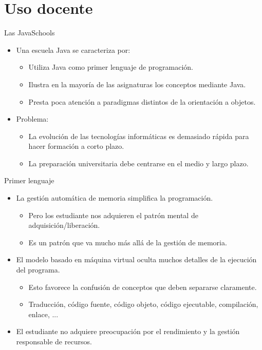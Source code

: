 \section{Uso docente}

\begin{frame}[t]{Las JavaSchools}
  \begin{itemize}
    \item Una escuela Java se caracteriza por:
      \begin{itemize}
        \item Utiliza Java como primer lenguaje de programación.
        \item Ilustra en la mayoría de las asignaturas los conceptos mediante Java.
        \item Presta poca atención a paradigmas distintos de la orientación a objetos.
      \end{itemize}
    \item Problema:
      \begin{itemize}
        \item La evolución de las tecnologías informáticas es demasiado rápida para hacer formación a corto plazo.
        \item La preparación universitaria debe centrarse en el medio y largo plazo.
      \end{itemize}
  \end{itemize}
\end{frame}

\begin{frame}[t]{Primer lenguaje}
  \begin{itemize}
    \item La gestión automática de memoria simplifica la programación.
      \begin{itemize}
        \item Pero los estudiante nos adquieren el patrón mental de adquisición/liberación.
        \item Es un patrón que va mucho más allá de la gestión de memoria.
      \end{itemize}
    \item El modelo basado en máquina virtual oculta muchos detalles de la ejecución del programa.
      \begin{itemize}
        \item Esto favorece la confusión de conceptos que deben separarse claramente.
        \item Traducción, código fuente, código objeto, código ejecutable, compilación, enlace, ...
      \end{itemize}
    \item El estudiante no adquiere preocupación por el rendimiento y la gestión responsable de recursos.
  \end{itemize}
\end{frame}


